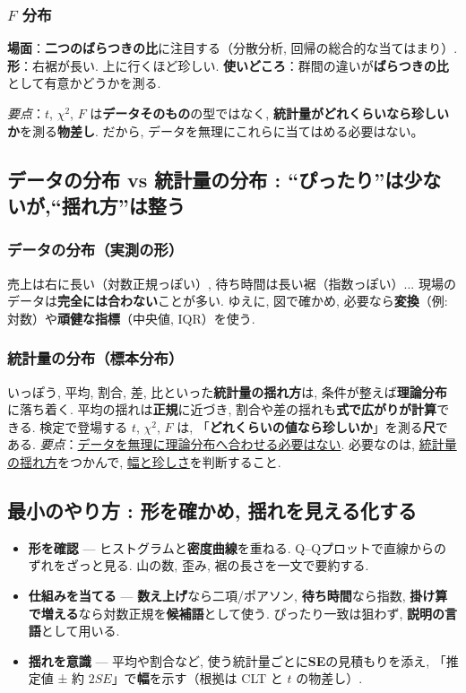     \subsubsection*{$F$ 分布}
      \textbf{場面}：\textbf{二つのばらつきの比}に注目する（分散分析, 回帰の総合的な当てはまり）.  
      \textbf{形}：右裾が長い. 上に行くほど珍しい.  
      \textbf{使いどころ}：群間の違いが\textbf{ばらつきの比}として有意かどうかを測る.

    \medskip
    \noindent \textit{要点}：$t$, $\chi^2$, $F$ は\textbf{データそのもの}の型ではなく, \textbf{統計量がどれくらいなら珍しいか}を測る\textbf{物差し}.  
    だから, データを無理にこれらに当てはめる必要はない。

  \subsection{データの分布 vs 統計量の分布 : “ぴったり”は少ないが,“揺れ方”は整う}
    \subsubsection*{データの分布（実測の形）}
      売上は右に長い（対数正規っぽい）, 待ち時間は長い裾（指数っぽい）... 現場のデータは\textbf{完全には合わない}ことが多い.  
      ゆえに, 図で確かめ, 必要なら\textbf{変換}（例: 対数）や\textbf{頑健な指標}（中央値, IQR）を使う.

    \subsubsection*{統計量の分布（標本分布）}
      いっぽう, 平均, 割合, 差, 比といった\textbf{統計量の揺れ方}は, 条件が整えば\textbf{理論分布}に落ち着く.  
      平均の揺れは\textbf{正規}に近づき, 割合や差の揺れも\textbf{式で広がりが計算}できる.  
      検定で登場する $t$, $\chi^2$, $F$ は, 「\textbf{どれくらいの値なら珍しいか}」を測る\textbf{尺}である.  
      \textit{要点}：\underline{データを無理に理論分布へ合わせる必要はない}. 必要なのは, \underline{統計量の揺れ方}をつかんで, \underline{幅と珍しさ}を判断すること.

  \subsection{最小のやり方 : 形を確かめ, 揺れを見える化する}
    \begin{itemize}
      \item \textbf{形を確認} — ヒストグラムと\textbf{密度曲線}を重ねる. Q--Qプロットで直線からのずれをざっと見る.  
            山の数, 歪み, 裾の長さを一文で要約する.
      \item \textbf{仕組みを当てる} — \textbf{数え上げ}なら二項/ポアソン, \textbf{待ち時間}なら指数, \textbf{掛け算で増える}なら対数正規を\textbf{候補語}として使う.  
            ぴったり一致は狙わず, \textbf{説明の言語}として用いる.
      \item \textbf{揺れを意識} — 平均や割合など, 使う統計量ごとに\textbf{SE}の見積もりを添え, 「推定値 ± 約 $2SE$」で\textbf{幅}を示す（根拠は CLT と $t$ の物差し）.
    \end{itemize}

